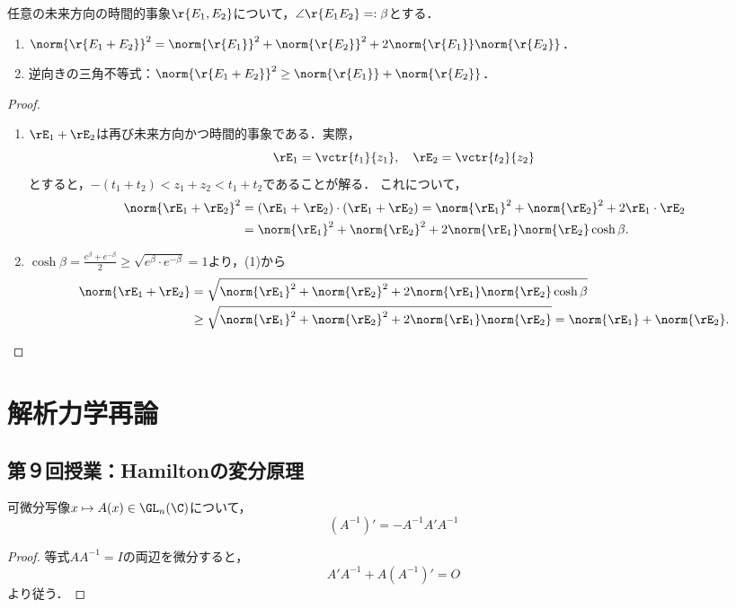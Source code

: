 \documentclass[uplatex,dvipdfmx]{jsarticle}
\begin{document}
\begin{exercise}[Minkowski空間に於ける逆向きの三角不等式]
    任意の未来方向の時間的事象$\r{E_1,E_2}$について，$\angle\r{E_1E_2}=:\beta$とする．
    \begin{enumerate}
        \item $\norm{\r{E_1+E_2}}^2=\norm{\r{E_1}}^2+\norm{\r{E_2}}^2+2\norm{\r{E_1}}\norm{\r{E_2}}$．
        \item 逆向きの三角不等式：$\norm{\r{E_1+E_2}}^2\ge\norm{\r{E_1}}+\norm{\r{E_2}}$．
    \end{enumerate}
\end{exercise}
\begin{proof}\mbox{}
    \begin{enumerate}
        \item $\rE_1+\rE_2$は再び未来方向かつ時間的事象である．実際，
        \[\rE_1=\vctr{t_1}{z_1},\quad\rE_2=\vctr{t_2}{z_2}\]
        とすると，$-(t_1+t_2)<z_1+z_2<t_1+t_2$であることが解る．
        これについて，
        \begin{align*}
            \norm{\rE_1+\rE_2}^2&=(\rE_1+\rE_2)\cdot(\rE_1+\rE_2)=\norm{\rE_1}^2+\norm{\rE_2}^2+2\rE_1\cdot\rE_2\\
            &=\norm{\rE_1}^2+\norm{\rE_2}^2+2\norm{\rE_1}\norm{\rE_2}\cosh\beta.
        \end{align*}
        \item $\cosh\beta=\frac{e^\beta+e^{-\beta}}{2}\ge\sqrt{e^\beta\cdot e^{-\beta}}=1$より，(1)から
        \begin{align*}
            \norm{\rE_1+\rE_2}&=\sqrt{\norm{\rE_1}^2+\norm{\rE_2}^2+2\norm{\rE_1}\norm{\rE_2}\cosh\beta}\\
            &\ge\sqrt{\norm{\rE_1}^2+\norm{\rE_2}^2+2\norm{\rE_1}\norm{\rE_2}}=\norm{\rE_1}+\norm{\rE_2}.
        \end{align*}
    \end{enumerate}
\end{proof}

\section{解析力学再論}

\subsection{第９回授業：Hamiltonの変分原理}

\begin{lemma*}[逆行列の微分則]
    可微分写像$x\mapsto A(x)\in\GL_n(\C)$について，
    \[(A^{-1})'=-A^{-1}A'A^{-1}\]
\end{lemma*}
\begin{proof}
    等式$AA^{-1}=I$の両辺を微分すると，
    \[A'A^{-1}+A(A^{-1})'=O\]
    より従う．
\end{proof}
\end{document}
